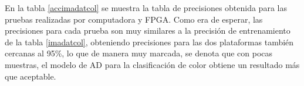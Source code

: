 \documentclass[twoside,spanish,ESP,MSc]{plantillaLabUPV}
\theoremstyle{definition}
\begin{document}
En la tabla \ref{accimadatcol} se muestra la tabla de precisiones obtenida para las pruebas realizadas por computadora y FPGA. Como era de esperar, las precisiones para cada prueba son muy similares a la precisión de entrenamiento de la tabla \ref{imadatcol}, obteniendo precisiones para las dos plataformas también cercanas al 95\%, lo que de manera muy marcada, se denota que con pocas muestras, el modelo de AD para la clasificación de color obtiene un resultado más que aceptable.


\begin{table}[!tbh]
	\caption{Precisión por computadora y FPGA de modelo AD de clasificación de color.}
	\label{accimadatcol}
	\centering

\end{table}
\end{document}
